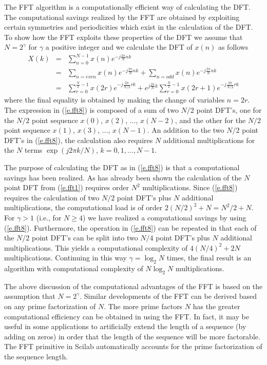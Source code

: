 	The FFT algorithm is a computationally
efficient way of calculating the DFT.  The computational
savings realized by the FFT are obtained by
exploiting certain symmetries and periodicities which exist in the
calculation of the DFT.  To show how the FFT
exploits these properties of the DFT we assume that $N=2^{\gamma}$
for $\gamma$ a positive integer and we calculate
the DFT of $x(n)$ as follows
%
\begin{eqnarray}
X(k)&=&\sum_{n=0}^{N-1}x(n)e^{-j\frac{2\pi}{N}nk}\nonumber\\
    &=&\sum_{n=even}x(n)e^{-j\frac{2\pi}{N}nk}+\sum_{n=odd}x(n)e^{-j\frac{2\pi}{N}nk}\nonumber\\
    &=&\sum_{r=0}^{\frac{N}{2}-1}x(2r)e^{-j\frac{2\pi}{N/2}rk}+e^{j\frac{2\pi}{N}k}\sum_{r=0}^{\frac{N}{2}-1}x(2r+1)e^{-j\frac{2\pi}{N/2}rk}
\label{e.fft8}
\end{eqnarray}
%
where the final equality is obtained by making
the change of variables $n=2r$.  The expression in (\ref{e.fft8})
is composed of a sum of two $N/2$ point DFT's, 
one for the $N/2$ point sequence $x(0)$, $x(2)$, $\ldots$, $x(N-2)$,
and the other for the $N/2$ point sequence $x(1)$, $x(3)$, $\ldots$, $x(N-1)$.
An addition to the two $N/2$ point DFT's in (\ref{e.fft8}), the
calculation also requires $N$ additional multiplications
for the $N$ terms $\exp(j2\pi k/N)$, $k=0,1,\ldots,N-1$.

	The purpose of calculating the DFT as in 
(\ref{e.fft8}) is that a computational savings has been realized.
As has already been shown the calculation of the $N$ point DFT
from (\ref{e.fft1}) requires order $N^2$ multiplications.  Since
(\ref{e.fft8}) requires the calculation of two $N/2$ point DFT's
plus $N$ additional multiplications, the computational load
is of order $2(N/2)^2+N=N^2/2+N$.  For $\gamma>1$ 
(i.e., for $N\ge4$) we have realized a computational savings
by using (\ref{e.fft8}).  Furthermore, the operation in (\ref{e.fft8})
can be repeated in that each of the $N/2$ point
DFT's can be split into two $N/4$ point DFT's
plus $N$ additional multiplications.
This yields a computational complexity of $4(N/4)^2+2N$ multiplications.
Continuing in this way $\gamma=\log_2N$ times, the final result
is an algorithm with computational complexity of $N\log_2N$ multiplications.

	The above discussion of the computational advantages of the FFT
is based on the assumption that $N=2^{\gamma}$.  Similar developments
of the FFT can be derived based on any prime factorization of $N$.
The more prime factors $N$ has the greater computational efficiency
can be obtained in using the FFT.  In fact, it may be useful in some
applications to artificially extend the length of a sequence (by adding on
zeros) in order that the length of the sequence will be more factorable.
The FFT primitive in Scilab automatically accounts for the prime
factorization of the sequence length. 

